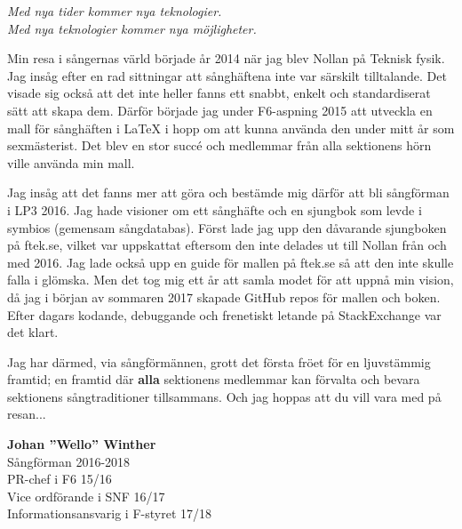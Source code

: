 {\large
\setlength{\parskip}{0.8em}
\textit{Med nya tider kommer nya teknologier.}\\
\textit{Med nya teknologier kommer nya möjligheter.}

Min resa i sångernas värld började år 2014 när jag blev Nollan på Teknisk fysik. Jag insåg efter en rad sittningar att sånghäftena inte var särskilt tilltalande. Det visade sig också att det inte heller fanns ett snabbt, enkelt och standardiserat sätt att skapa dem.
Därför började jag under F6-aspning 2015 att utveckla en mall för sånghäften i LaTeX i hopp om att kunna använda den under mitt år som sexmästerist.
Det blev en stor succé och medlemmar från alla sektionens hörn ville använda min mall.

Jag insåg att det fanns mer att göra och bestämde mig därför att bli sångförman i LP3 2016.
Jag hade visioner om ett sånghäfte och en sjungbok som levde i symbios (gemensam sångdatabas).
Först lade jag upp den dåvarande sjungboken på ftek.se, vilket var uppskattat eftersom den inte delades ut till Nollan från och med 2016.
Jag lade också upp en guide för mallen på ftek.se så att den inte skulle falla i glömska.
Men det tog mig ett år att samla modet för att uppnå min vision, då jag i början av sommaren 2017 skapade GitHub repos för mallen och boken.
Efter dagars kodande, debuggande och frenetiskt letande på StackExchange var det klart.

Jag har därmed, via sångförmännen, grott det första fröet för en ljuvstämmig framtid; en framtid där \textbf{alla} sektionens medlemmar kan förvalta och bevara sektionens sångtraditioner tillsammans. Och jag hoppas att du vill vara med på resan...

\begin{flushright}
\textbf{Johan ''Wello'' Winther}\\
Sångförman 2016-2018\\
PR-chef i F6 15/16\\
Vice ordförande i SNF 16/17\\
Informationsansvarig i F-styret 17/18\\
\end{flushright}
}

